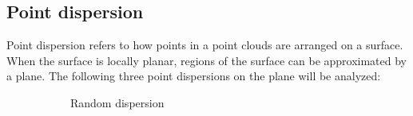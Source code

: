 \subsection{Point dispersion}
Point dispersion refers to how points in a point clouds are arranged on a surface. When the surface is locally planar, regions of the surface can be approximated by a plane. The following three point dispersions on the plane will be analyzed:
\begin{figure}[H]
\centering
\hspace*{\fill}%
\begin{subfigure}{.3\textwidth}
{
	\setlength{\fboxsep}{0pt}%
	\setlength{\fboxrule}{0.5pt}%
	\caption{Random dispersion}
}
\end{subfigure}%
\hfill%
\begin{subfigure}{.3\textwidth}
{
	\setlength{\fboxsep}{0pt}%
	\setlength{\fboxrule}{0.5pt}%
}
\end{subfigure}
\end{figure}
